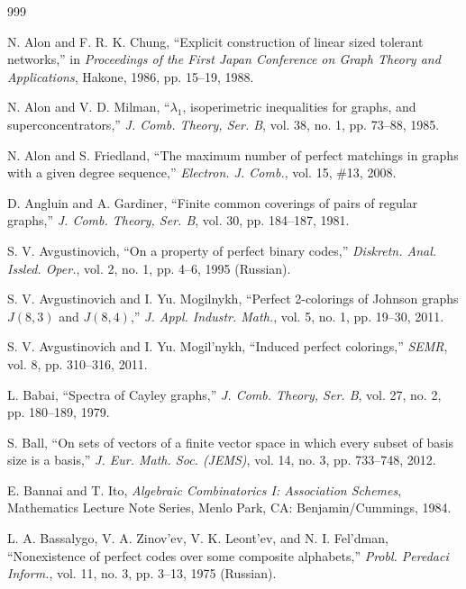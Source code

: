\documentclass[11pt]{article}
\theoremstyle{definition}
\begin{document}
{{{\pagebreak


\begin{thebibliography}{999}

N. Alon and F. R. K. Chung,
``Explicit construction of linear sized tolerant networks,''
in \textit{Proceedings of the First Japan Conference on Graph Theory and Applications},
Hakone, 1986, pp. 15--19, 1988.

N. Alon and V. D. Milman,
``$\lambda_1$, isoperimetric inequalities for graphs, and superconcentrators,''
\textit{J. Comb. Theory, Ser. B}, vol. 38, no. 1, pp. 73--88, 1985.

N. Alon and S. Friedland,
``The maximum number of perfect matchings in graphs with a given degree sequence,''
\textit{Electron. J. Comb.}, vol. 15, \#13, 2008.

D. Angluin and A. Gardiner,
``Finite common coverings of pairs of regular graphs,''
\textit{J. Comb. Theory, Ser. B}, vol. 30, pp. 184--187, 1981.

S. V. Avgustinovich,
``On a property of perfect binary codes,''
\textit{Diskretn. Anal. Issled. Oper.}, vol. 2, no. 1, pp. 4--6, 1995 (Russian).

S. V. Avgustinovich and I. Yu. Mogilnykh,
``Perfect 2-colorings of Johnson graphs $J(8,3)$ and $J(8,4)$,''
\textit{J. Appl. Industr. Math.}, vol. 5, no. 1, pp. 19--30, 2011.

S. V. Avgustinovich and I. Yu. Mogil'nykh,
``Induced perfect colorings,''
\textit{SEMR}, vol. 8, pp. 310--316, 2011.

L. Babai,
``Spectra of Cayley graphs,''
\textit{J. Comb. Theory, Ser. B}, vol. 27, no. 2, pp. 180--189, 1979.

S. Ball,
``On sets of vectors of a finite vector space in which every subset of basis size is a basis,''
\textit{J. Eur. Math. Soc. (JEMS)}, vol. 14, no. 3, pp. 733--748, 2012.

E. Bannai and T. Ito,
\textit{Algebraic Combinatorics I: Association Schemes},
Mathematics Lecture Note Series, Menlo Park, CA: Benjamin/Cummings, 1984.

L. A. Bassalygo, V. A. Zinov'ev, V. K. Leont'ev, and N. I. Fel'dman,
``Nonexistence of perfect codes over some composite alphabets,''
\textit{Probl. Peredaci Inform.}, vol. 11, no. 3, pp. 3--13, 1975 (Russian).


\end{thebibliography}}}}
\end{document}

